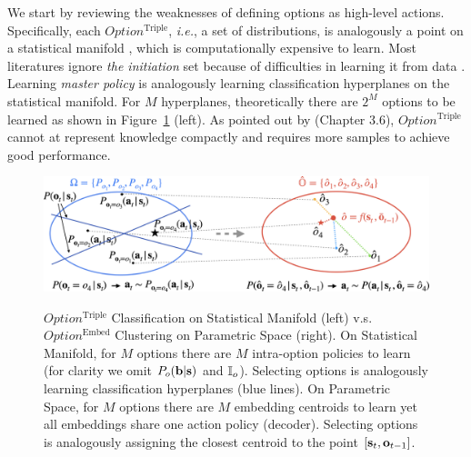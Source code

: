 \documentclass[10pt,journal,compsoc]{IEEEtran}
\renewcommand{\citename}{\citet}
\renewcommand{\cite}{\citep}
\begin{document}
We start by reviewing the weaknesses of defining options as high-level actions. Specifically, each $Option^{\textrm{Triple}}$, \textit{i.e.}, a
set of distributions, is analogously a point on a statistical
manifold \cite{amari1987differential}, which is 
computationally expensive to learn. Most literatures ignore
\emph{the initiation} set because of difficulties in learning it
from data \cite{khetarpal2020options}. Learning \emph{master
  policy} is analogously learning classification hyperplanes
\cite{mankowitz2016adaptive} on the statistical manifold. For $M$
hyperplanes, theoretically there are $2^M$ options to be learned as shown in Figure~\ref{fig:o2v_manifold} (left). As pointed out by \citename{bacon2018temporal} (Chapter
3.6), $Option^{\textrm{Triple}}$ cannot at represent knowledge compactly and requires more samples to achieve good performance.
\begin{figure}[h!]
 \centering
  \includegraphics[width=0.9\linewidth]{figures/O2V_Manifold.png}\\
 \centering
  \caption{\label{fig:o2v_manifold} \small
    $Option^{\textrm{Triple}}$ Classification on Statistical
      Manifold (left) v.s. $Option^{\textrm{Embed}}$ Clustering on
    Parametric Space (right). On Statistical Manifold, for $M$
    options there are $M$ intra-option policies to learn
    (for clarity we omit $P_o({\mathbf{b}}|{\mathbf{s}})$ and ${\mathbb{I}}_o$). Selecting
    options is analogously learning classification 
      hyperplanes (blue lines). On Parametric Space, for $M$
    options there are $M$ embedding centroids to learn yet
    all embeddings share one action policy (decoder).
    Selecting options is analogously assigning the closest
      centroid to the point $[{\mathbf{s}}_t,{\mathbf{o}}_{t-1}]$.}
\end{figure}
\end{document}
